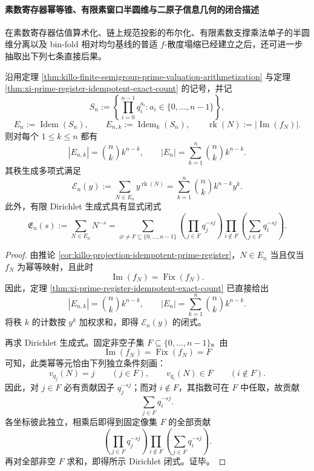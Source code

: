 \paragraph{素数寄存器幂等锥、有限素窗口半圆维与二原子信息几何的闭合描述}
在素数寄存器估值算术化、链上规范投影的布尔化、有限素数支撑乘法单子的半圆维分离以及 bin-fold 相对均匀基线的普适 \(f\)-散度塌缩已经建立之后，还可进一步抽取出下列七条直接后果。

\begin{theorem}\label{thm:xi-prime-register-idempotent-cone-rank-dirichlet}
沿用定理 \ref{thm:killo-finite-semigroup-prime-valuation-arithmetization} 与定理 \ref{thm:xi-prime-register-idempotent-exact-count} 的记号，并记
\[
S_n:=\left\{\prod_{i=0}^{n-1}q_i^{a_i}: a_i\in\{0,\dots,n-1\}\right\},
\]
\[
E_n:=\operatorname{Idem}(S_n),
\qquad
E_{n,k}:=\operatorname{Idem}_k(S_n),
\qquad
\operatorname{rk}(N):=|\operatorname{Im}(f_N)|.
\]
则对每个 \(1\le k\le n\) 都有
\[
|E_{n,k}|=\binom{n}{k}k^{n-k},
\qquad
|E_n|=\sum_{k=1}^{n}\binom{n}{k}k^{n-k}.
\]
其秩生成多项式满足
\[
\mathcal E_n(y):=\sum_{N\in E_n}y^{\operatorname{rk}(N)}
=
\sum_{k=1}^{n}\binom{n}{k}k^{n-k}y^k.
\]
此外，有限 Dirichlet 生成式具有显式闭式
\[
\mathfrak E_n(s):=\sum_{N\in E_n}N^{-s}
=
\sum_{\varnothing\neq F\subseteq\{0,\dots,n-1\}}
\left(\prod_{j\in F}q_j^{-sj}\right)
\prod_{i\notin F}\left(\sum_{j\in F}q_i^{-sj}\right).
\]
\end{theorem}
\begin{proof}
由推论 \ref{cor:killo-projection-idempotent-prime-register}，\(N\in E_n\) 当且仅当 \(f_N\) 为幂等映射，且此时
\[
\operatorname{Im}(f_N)=\operatorname{Fix}(f_N).
\]
因此，定理 \ref{thm:xi-prime-register-idempotent-exact-count} 已直接给出
\[
|E_{n,k}|=\binom{n}{k}k^{n-k},
\qquad
|E_n|=\sum_{k=1}^{n}\binom{n}{k}k^{n-k}.
\]
将秩 \(k\) 的计数按 \(y^k\) 加权求和，即得 \(\mathcal E_n(y)\) 的闭式。

再求 Dirichlet 生成式。固定非空子集 \(F\subseteq\{0,\dots,n-1\}\)。由
\[
\operatorname{Im}(f_N)=\operatorname{Fix}(f_N)=F
\]
可知，此类幂等元恰由下列独立条件刻画：
\[
v_{q_j}(N)=j\qquad (j\in F),
\qquad
v_{q_i}(N)\in F\qquad (i\notin F).
\]
因此，对 \(j\in F\) 必有贡献因子 \(q_j^{-sj}\)；而对 \(i\notin F\)，其指数可在 \(F\) 中任取，故贡献
\[
\sum_{j\in F}q_i^{-sj}.
\]
各坐标彼此独立，相乘后即得到固定像集 \(F\) 的全部贡献
\[
\left(\prod_{j\in F}q_j^{-sj}\right)
\prod_{i\notin F}\left(\sum_{j\in F}q_i^{-sj}\right).
\]
再对全部非空 \(F\) 求和，即得所示 Dirichlet 闭式。证毕。
\end{proof}


